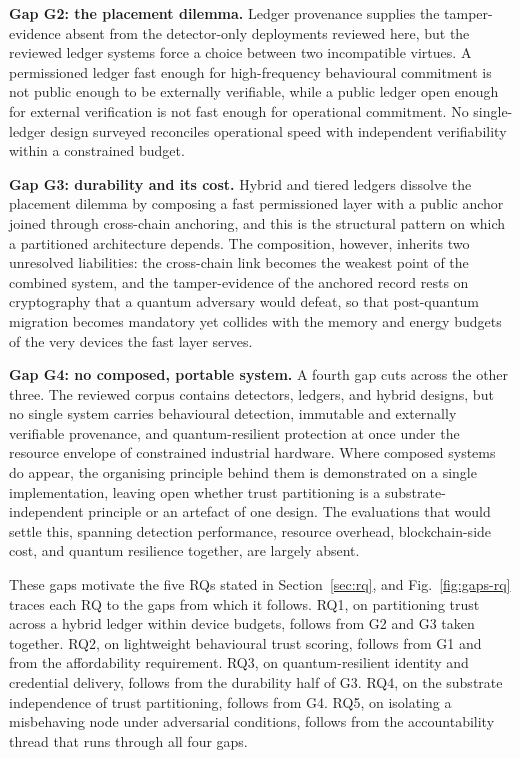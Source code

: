 \textbf{Gap G2: the placement dilemma.} Ledger provenance supplies the
tamper-evidence absent from the detector-only deployments reviewed here, but the
reviewed ledger systems force a choice between two incompatible virtues. A
permissioned ledger fast enough for high-frequency behavioural commitment is not
public enough to be externally verifiable, while a public ledger open enough for
external verification is not fast enough for operational commitment. No
single-ledger design surveyed reconciles operational speed with independent
verifiability within a constrained budget.

\textbf{Gap G3: durability and its cost.} Hybrid and tiered ledgers dissolve the
placement dilemma by composing a fast permissioned layer with a public anchor
joined through cross-chain anchoring, and this is the structural pattern on which
a partitioned architecture depends. The composition, however, inherits two
unresolved liabilities: the cross-chain link becomes the weakest point of the
combined system, and the tamper-evidence of the anchored record rests on
cryptography that a quantum adversary would defeat, so that post-quantum
migration becomes mandatory yet collides with the memory and energy budgets of
the very devices the fast layer serves.

\textbf{Gap G4: no composed, portable system.} A fourth gap cuts across the other
three. The reviewed corpus contains detectors, ledgers, and hybrid designs, but
no single system carries behavioural detection, immutable and externally
verifiable provenance, and quantum-resilient protection at once under the
resource envelope of constrained industrial hardware. Where composed systems do
appear, the organising principle behind them is demonstrated on a single
implementation, leaving open whether trust partitioning is a
substrate-independent principle or an artefact of one design. The evaluations
that would settle this, spanning detection performance, resource overhead,
blockchain-side cost, and quantum resilience together, are largely absent.

These gaps motivate the five RQs stated in
Section~\ref{sec:rq}, and Fig.~\ref{fig:gaps-rq} traces each RQ to the gaps
from which it follows. RQ1, on partitioning trust across a hybrid ledger within
device budgets, follows from G2 and G3 taken together. RQ2, on lightweight
behavioural trust scoring, follows from G1 and from the affordability
requirement. RQ3, on quantum-resilient identity and credential delivery, follows
from the durability half of G3. RQ4, on the substrate independence of trust
partitioning, follows from G4. RQ5, on isolating a misbehaving node under
adversarial conditions, follows from the accountability thread that runs through
all four gaps.

